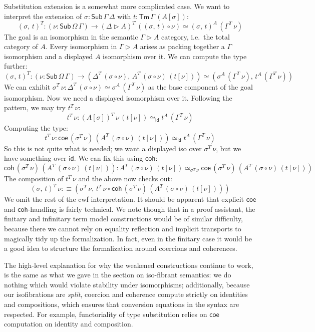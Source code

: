 \documentclass[12pt,a4paper,twoside,openany]{book}
\theoremstyle{remark}
\theoremstyle{definition}
\theoremstyle{theorem}
\newcommand{\id}{\mathsf{id}}
\newcommand{\Sub}{\mathsf{Sub}}
\newcommand{\Tm}{\mathsf{Tm}}
\newcommand{\ext}{\triangleright}
\newcommand{\coe}{\mathsf{coe}}
\newcommand{\coh}{\mathsf{coh}}
\newcommand{\defn}{:\equiv}
\begin{document}
Substitution extension is a somewhat more complicated case. We want to interpret
the extension of $\sigma : \Sub\,\Gamma\,\Delta$ with $t :
\Tm\,\Gamma\,(A[\sigma])$:
\[
      (\sigma,\,t)^T : (\nu : \Sub\,\Omega\,\Gamma)
  \to (\Delta \ext A)^T\,((\sigma,\,t)\circ\nu)\simeq(\sigma,\,t)^A\,(\Gamma^T\,\nu)
\]
The goal is an isomorphism in the semantic $\Gamma \ext A$ category, i.e.\ the
total category of $A$. Every isomorphism in $\Gamma \ext A$ arises as packing
together a $\Gamma$ isomorphism and a displayed $A$ isomorphism over it. We can compute
the type further:
\[
      (\sigma,\,t)^T : (\nu : \Sub\,\Omega\,\Gamma)
  \to (\Delta^T\,(\sigma \circ \nu),\,A^T\,(\sigma\circ\nu)\,(t[\nu])) \simeq (\sigma^A\,(\Gamma^T\,\nu),\,t^A\,(\Gamma^T\,\nu))
\]
We can exhibit $\sigma^T\,\nu : \Delta^T\,(\sigma \circ \nu) \simeq
\sigma^A\,(\Gamma^T\,\nu)$ as the base component of the goal isomorphism. Now we
need a displayed isomorphism over it. Following the pattern, we may try
$t^T\,\nu$:
\[
  t^T\,\nu : (A[\sigma])^T\,\nu\,(t[\nu]) \simeq_{\id} t^A\,(\Gamma^T\,\nu)
\]
Computing the type:
\[
  t^T\,\nu : \coe\,(\sigma^T\,\nu)\,(A^T\,(\sigma\circ\nu)\,(t[\nu])) \simeq_{\id} t^A\,(\Gamma^T\,\nu)
\]
So this is not quite what is needed; we want a displayed iso over $\sigma^T\,\nu$, but we have
something over $\id$. We can fix this using $\coh$:
\[
\coh\,(\sigma^T\,\nu)\,(A^T\,(\sigma\circ\nu)\,(t[\nu])) :
A^T\,(\sigma\circ\nu)\,(t[\nu]) \simeq_{\sigma^T\,\nu} \coe\,(\sigma^T\,\nu)\,(A^T\,(\sigma\circ\nu)\,(t[\nu]))
\]
The composition of $t^T\,\nu$ and the above now checks out:
\[
  (\sigma,\,t)^T\,\nu \defn (\sigma^T\,\nu,\,t^T\,\nu\circ \coh\,(\sigma^T\,\nu)\,(A^T\,(\sigma\circ\nu)\,(t[\nu])))
\]
We omit the rest of the cwf interpretation. It should be apparent that explicit
$\coe$ and $\coh$-handling is fairly technical. We note though that in a proof
assistant, the finitary and infinitary term model constructions would be of
similar difficulty, because there we cannot rely on equality reflection and
implicit transports to magically tidy up the formalization. In fact, even in the
finitary case it would be a good idea to structure the formalization around
coercions and coherences.

The high-level explanation for why the weakened constructions continue to work,
is the same as what we gave in the section on iso-fibrant semantics: we do
nothing which would violate stability under isomorphisms; additionally, because
our isofibrations are \emph{split}, coercion and coherence compute strictly on
identities and compositions, which ensures that conversion equations in the
syntax are respected. For example, functoriality of type substitution relies on
$\coe$ computation on identity and composition.
\end{document}

